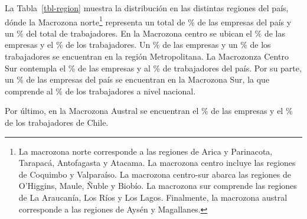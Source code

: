 \documentclass[
  11pt,
]{article}
\begin{document}
La Tabla~\ref{tbl-region} muestra la distribución en las distintas
regiones del país, dónde la Macrozona norte\footnote{La macrozona norte
  corresponde a las regiones de Arica y Parinacota, Tarapacá,
  Antofagasta y Atacama. La macrozona centro incluye las regiones de
  Coquimbo y Valparaíso. La macrozona centro-sur abarca las regiones de
  O'Higgins, Maule, Ñuble y Biobío. La macrozona sur comprende las
  regiones de La Araucanía, Los Ríos y Los Lagos. Finalmente, la
  macrozona austral corresponde a las regiones de Aysén y Magallanes.}
representa un total de \% de las empresas del país y un
\% del total de trabajadores. En la Macrozona centro se ubican
el \% de las empresas y el \% de los trabajadores.
Un \% de las empresas y un \% de los trabajadores se
encuentran en la región Metropolitana. La Macrozonza Centro Sur
contempla el \% de las empresas y al \% de
trabajadores del país. Por su parte, un \% de las empresas
del país se encuentran en la Macrozona Sur, la que comprende al
\% de los trabajadores a nivel nacional.

Por último, en la Macrozona Austral se encuentran el \% de las
empresas y el \% de los trabajadores de Chile.

\vspace{5mm}

\FloatBarrier
\end{document}
